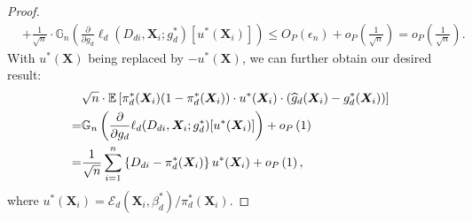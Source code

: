 \documentclass[11pt]{article}
\numberwithin{equation}{section}
\begin{document}
\begin{proof}
\begin{align*}
		&+\frac{1}{\sqrt{n}}  \cdot  \mathbb{G}_n\left(\frac{\partial}{\partial g_d}\ell_d(D_{di},\boldsymbol{X}_{i};g^*_d)[u^*(\boldsymbol{X}_{i})]\right)\leq O_P(\epsilon_n)+o_P\left(\frac{1}{\sqrt{n}}\right)=o_P\left(\frac{1}{\sqrt{n}}\right).
	\end{align*}
	With $u^*(\boldsymbol{X})$ being replaced by $-u^*(\boldsymbol{X})$, we can further obtain our desired result:
	\begin{align*}
		&\sqrt{n}\cdot \mathbb{E}\left[ \pi^*_d(\boldsymbol{X}_{i})(1-\pi^*_d(\boldsymbol{X}_{i}))\cdot u^*(\boldsymbol{X}_{i}) \cdot (\widehat{g}_d(\boldsymbol{X}_{i})-g^*_d(\boldsymbol{X}_{i}))\right]\notag\\
		=&\mathbb{G}_n\left(\frac{\partial}{\partial g_d}\ell_d(D_{di},\boldsymbol{X}_{i};g^*_d)[u^*(\boldsymbol{X}_{i})]\right)+o_P\left(1\right) \notag\\
		=&\frac{1}{\sqrt{n}}\sum_{i=1}^n\left\{D_{di}-\pi^*_d(\boldsymbol{X}_i)\right\} u^*(\boldsymbol{X}_{i}) +o_P\left(1\right),
	\end{align*}
	where $u^*(\boldsymbol{X}_{i})=\mathcal{E}_d(\boldsymbol{X}_{i},\beta_d^*)/\pi_d^*(\boldsymbol{X}_i)$.
	
\end{proof}

\end{document}
